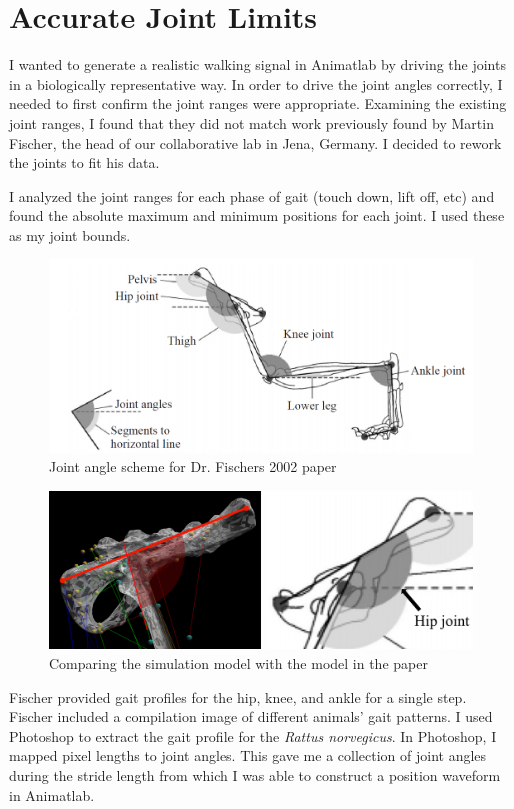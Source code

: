 \documentclass[runningheads,a4paper]{llncs}
\begin{document}
	\section{Accurate Joint Limits}
	I wanted to generate a realistic walking signal in Animatlab by driving the joints in a biologically representative way. In order to drive the joint angles correctly, I needed to first confirm the joint ranges were appropriate. Examining the existing joint ranges, I found that they did not match work previously found by Martin Fischer, the head of our collaborative lab in Jena, Germany. I decided to rework the joints to fit his data\cite{fischer_basic_2002}. \par
	I analyzed the joint ranges for each phase of gait (touch down, lift off, etc) and found the absolute maximum and minimum positions for each joint. I used these as my joint bounds. \par
			\begin{figure}
				\centering
				\includegraphics[width=.8\textwidth]{FischerAngles4.PNG}
				\caption{Joint angle scheme for Dr. Fischers 2002 paper}
			\end{figure}
			\begin{figure}
				\centering
				\includegraphics[width=\textwidth]{FischerAngles2.png}
				\caption{Comparing the simulation model with the model in the paper}
			\end{figure}
	Fischer provided gait profiles for the hip, knee, and ankle for a single step. Fischer included a compilation image of different animals’ gait patterns. I used Photoshop to extract the gait profile for the \textit{Rattus norvegicus}. In Photoshop, I mapped pixel lengths to joint angles. This gave me a collection of joint angles during the stride length from which I was able to construct a position waveform in Animatlab. \par
\end{document}
